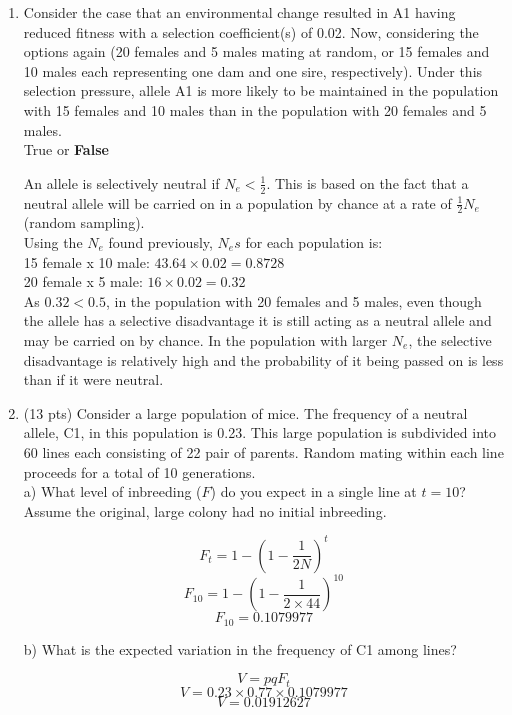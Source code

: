 \documentclass[a4paper, 11pt]{article}
\begin{document}
\begin{enumerate}
\item Consider the case that an environmental change resulted in A1 having reduced fitness with a
selection coefficient(s) of 0.02. Now, considering the options again (20 females and 5 males
mating at random, or 15 females and 10 males each representing one dam and one sire,
respectively). Under this selection pressure, allele A1 is more likely to be maintained in the
population with 15 females and 10 males than in the population with 20 females and 5 males.\\

True or \textbf{False}

An allele is selectively neutral if \(N_e<\frac{1}{2}\). This is based on the fact that a neutral allele will be carried on in a population by chance at a rate of \(\frac{1}{2}N_e\) (random sampling).\\

Using the $N_e$ found previously, $N_es$ for each population is:\\
15 female x 10 male: \(43.64 \times 0.02 = 0.8728\)\\
20 female x 5 male: \(16 \times 0.02 = 0.32\) \\

As \(0.32 < 0.5\), in the population with 20 females and 5 males, even though the allele has a selective disadvantage it is still acting as a neutral allele and may be carried on by chance. In the population with larger $N_e$, the selective disadvantage is relatively high and the probability of it being passed on is less than if it were neutral.

\item (13 pts) Consider a large population of mice. The frequency of a neutral allele, C1, in this population is 0.23. This large population is subdivided into 60 lines each consisting of 22 pair of parents. Random mating within each line proceeds for a total of 10 generations.\\

\subitem a) What level of inbreeding ($F$) do you expect in a single line at \(t = 10\)? Assume the original, large colony had no initial inbreeding.

\[F_t=1-(1-\frac{1}{2N})^t\]
\[F_{10}=1-(1-\frac{1}{2 \times 44})^{10}\]
\[F_{10}=0.1079977\]

\subitem b) What is the expected variation in the frequency of C1 among lines?

\[V=pqF_t\]
\[V=0.23 \times 0.77 \times 0.1079977\]
\[V=0.01912627\]


\end{enumerate}
\end{document}
